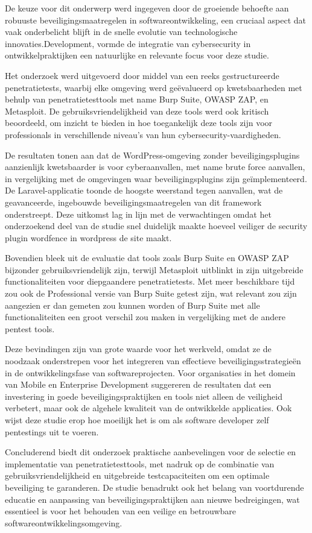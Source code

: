 De keuze voor dit onderwerp werd ingegeven door de groeiende behoefte aan robuuste beveiligingsmaatregelen in softwareontwikkeling, een cruciaal 
aspect dat vaak onderbelicht blijft in de snelle evolutie van technologische innovaties.Development, vormde de integratie van cybersecurity in 
ontwikkelpraktijken een natuurlijke en relevante focus voor deze studie.

Het onderzoek werd uitgevoerd door middel van een reeks gestructureerde penetratietests, waarbij elke omgeving werd geëvalueerd op 
kwetsbaarheden met behulp van penetratietesttools met name Burp Suite, OWASP ZAP, en Metasploit. De gebruiksvriendelijkheid 
van deze tools werd ook kritisch beoordeeld, om inzicht te bieden in hoe toegankelijk deze tools zijn voor professionals in verschillende 
niveau's van hun cybersecurity-vaardigheden.

De resultaten tonen aan dat de WordPress-omgeving zonder beveiligingsplugins aanzienlijk kwetsbaarder is voor cyberaanvallen, met name 
brute force aanvallen, in vergelijking met de omgevingen waar beveiligingsplugins zijn geïmplementeerd. De Laravel-applicatie toonde 
de hoogste weerstand tegen aanvallen, wat de geavanceerde, ingebouwde beveiligingsmaatregelen van dit framework onderstreept.
Deze uitkomst lag in lijn met de verwachtingen omdat het onderzoekend deel van de studie snel duidelijk maakte hoeveel veiliger 
de security plugin wordfence in wordpress de site maakt.

Bovendien bleek uit de evaluatie dat tools zoals Burp Suite en OWASP ZAP bijzonder gebruiksvriendelijk zijn, terwijl Metasploit 
uitblinkt in zijn uitgebreide functionaliteiten voor diepgaandere penetratietests. Met meer beschikbare tijd zou ook 
de Professional versie van Burp Suite getest zijn, wat relevant zou zijn aangezien er dan gemeten zou kunnen worden of Burp 
Suite met alle functionaliteiten een groot verschil zou maken in vergelijking met de andere pentest tools.

Deze bevindingen zijn van grote waarde voor het werkveld, omdat ze de noodzaak onderstrepen voor het integreren van effectieve 
beveiligingsstrategieën in de ontwikkelingsfase van softwareprojecten. Voor organisaties in het domein van Mobile en Enterprise 
Development suggereren de resultaten dat een investering in goede beveiligingspraktijken en tools niet alleen de veiligheid 
verbetert, maar ook de algehele kwaliteit van de ontwikkelde applicaties. Ook wijst deze studie erop hoe moeilijk het 
is om als software developer zelf pentestings uit te voeren.

Concluderend biedt dit onderzoek praktische aanbevelingen voor de selectie en implementatie van penetratietesttools, met 
nadruk op de combinatie van gebruiksvriendelijkheid en uitgebreide testcapaciteiten om een optimale beveiliging te 
garanderen. De studie benadrukt ook het belang van voortdurende educatie en aanpassing van beveiligingspraktijken aan nieuwe 
bedreigingen, wat essentieel is voor het behouden van een veilige en betrouwbare softwareontwikkelingsomgeving.
